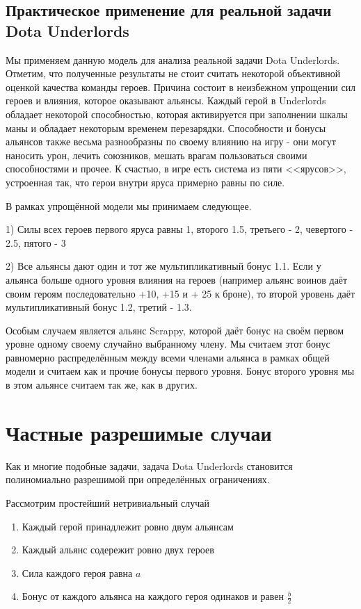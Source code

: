\documentclass{article}
\begin{document}
\subsection{Практическое применение для реальной задачи Dota Underlords}
  
Мы применяем данную модель для анализа реальной задачи Dota Underlords. Отметим, что полученные результаты не стоит считать некоторой объективной оценкой качества команды героев. Причина состоит в неизбежном упрощении сил героев и влияния, которое оказывают альянсы. Каждый герой в Underlords обладает некоторой способностью, которая активируется при заполнении шкалы маны и обладает некоторым временем перезарядки. Способности и бонусы альянсов также весьма разнообразны по своему влиянию на игру - они могут наносить урон, лечить союзников, мешать врагам пользоваться своими способностями и прочее. К счастью, в игре есть система из пяти <<ярусов>>, устроенная так, что герои внутри яруса примерно равны по силе.

В рамках упрощённой модели мы принимаем следующее.

1) Силы всех героев первого яруса равны 1, второго 1.5, третьего - 2, чевертого - 2.5, пятого - 3

2) Все альянсы дают один и тот же мультипликативный бонус 1.1. Если у альянса больше одного уровня влияния на героев (например альянс воинов даёт своим героям последовательно +10, +15 и + 25 к броне), то второй уровень даёт мультипликативный бонус 1.2, третий - 1.3.

Особым случаем является альянс Scrappy, которой даёт бонус на своём первом уровне одному своему случайно выбранному члену. Мы считаем этот бонус равномерно распределённым между всеми членами альянса в рамках общей модели и считаем как и прочие бонусы первого уровня. Бонус второго уровня мы в этом альянсе считаем так же, как в других.

\section{Частные разрешимые случаи}

Как и многие подобные задачи, задача Dota Underlords становится полиномиально разрешимой при определённых ограничениях. 

Рассмотрим простейший нетривиальный случай

\begin{enumerate}
    \item Каждый герой принадлежит ровно двум альянсам
    \item Каждый альянс содережит ровно двух героев
    \item Сила каждого героя равна $a$
    \item Бонус от каждого альянса на каждого героя одинаков и равен $\frac{b}{2}$
\end{enumerate}
\end{document}

